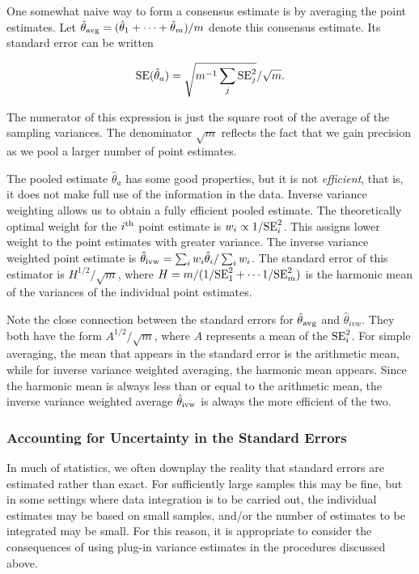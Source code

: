 One somewhat naive way to form a consensus estimate is by averaging the point estimates. Let $\hat{\theta}_{\rm avg} = (\hat{\theta}_1 + \cdots + \hat{\theta}_m)/m$ denote this consensus estimate. Its standard error can be written

$$
{\rm SE}(\hat{\theta}_a) = \sqrt{m^{-1}\sum_j {\rm SE}_j^2} / \sqrt{m}.
$$

\noindent The numerator of this expression is just the square root of the average of the sampling variances. The denominator $\sqrt{m}$ reflects the fact that we gain precision as we pool a larger number of point estimates.

The pooled estimate $\hat{\theta}_a$ has some good properties, but it is not \textit{efficient}, that is, it does not make full use of the information in the data. Inverse variance weighting allows us to obtain a fully efficient pooled estimate. The theoretically optimal weight for the $i^{\rm th}$ point estimate is $w_i \propto 1/{\rm SE}_i^2$. This assigns lower weight to the point estimates with greater variance. The inverse variance weighted point estimate is $\hat{\theta}_{\rm ivw} = \sum_i w_i \hat{\theta}_i / \sum_i w_i$. The standard error of this estimator is $H^{1/2} / \sqrt{m}$, where $H = m/(1/{\rm SE}_1^2 + \cdots 1/{\rm SE}_m^2)$ is the harmonic mean of the variances of the individual point estimates.

Note the close connection between the standard errors for $\hat{\theta}_{\rm avg}$ and $\hat{\theta}_{ivw}$. They both have the form $A^{1/2} / \sqrt{m}$, where $A$ represents a mean of the ${\rm SE}_i^2$. For simple averaging, the mean that appears in the standard error is the arithmetic mean, while for inverse variance weighted averaging, the harmonic mean appears. Since the harmonic mean is always less than or equal to the arithmetic mean, the inverse variance weighted average $\hat{\theta}_{\rm ivw}$ is always the more efficient of the two.

\subsubsection{Accounting for Uncertainty in the Standard Errors}

In much of statistics, we often downplay the reality that standard errors are estimated rather than exact. For sufficiently large samples this may be fine, but in some settings where data integration is to be carried out, the individual estimates may be based on small samples, and/or the number of estimates to be integrated may be small. For this reason, it is appropriate to consider the consequences of using plug-in variance estimates in the procedures discussed above.

